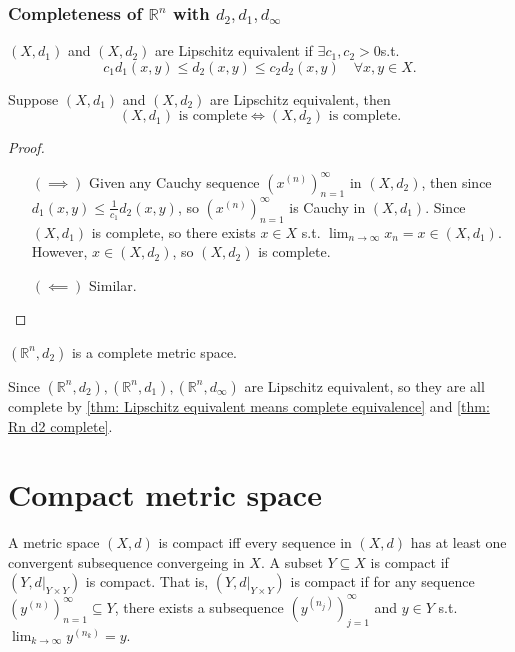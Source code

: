 \subsubsection{Completeness of \(\mathbb{R}^n\) with \(d_2, d_1, d_\infty \) }
\begin{prev}
    \((X, d_1)\) and \((X, d_2)\) are Lipschitz equivalent if \(\exists c_1, c_2 > 0\)s.t. 
    \[
        c_1 d_1(x, y) \le d_2(x, y) \le c_2 d_2(x, y) \quad \forall x, y \in X. 
    \]   
\end{prev}

\begin{theorem} \label{thm: Lipschitz equivalent means complete equivalence}
    Suppose \((X, d_1)\) and \((X, d_2)\) are Lipschitz equivalent, then 
    \[
        (X, d_1) \text{ is complete} \iff (X, d_2) \text{ is complete}.
    \]  
\end{theorem}
\begin{proof}
    \vphantom{text}
    \begin{itemize}
        \item [\((\implies )\)] Given any Cauchy sequence \(\left( x^{(n)} \right)_{n=1}^{\infty}  \) in \((X, d_2)\), then since \(d_1(x, y) \le \frac{1}{c_1} d_2(x, y)\), so \(\left( x^{(n)} \right)_{n=1}^{\infty}  \) is Cauchy in \((X, d_1)\). Since \((X, d_1)\) is complete, so there exists \(x \in X\) s.t. \(\lim_{n \to \infty} x_n = x \in (X, d_1)\). However, \(x \in (X, d_2)\), so \((X, d_2)\) is complete. 
        \item [\((\impliedby )\)] Similar.         
    \end{itemize}
\end{proof}

\begin{theorem} \label{thm: Rn d2 complete}
    \(\left( \mathbb{R} ^n, d_2 \right) \) is a complete metric space. 
\end{theorem}

\begin{corollary}
    Since \(\left( \mathbb{R}^n , d_2\right), \left( \mathbb{R} ^n, d_1 \right), \left( \mathbb{R} ^n, d_\infty  \right)   \) are Lipschitz equivalent, so they are all complete by \autoref{thm: Lipschitz equivalent means complete equivalence} and \autoref{thm: Rn d2 complete}.
\end{corollary}

\section{Compact metric space}
\begin{definition} \label{def: compect}
    A metric space \((X, d)\) is compact iff every sequence in \((X, d)\) has at least one convergent subsequence convergeing in \(X\). A subset \(Y \subseteq X\) is compact if \(\left( Y, d\vert_{Y \times Y} \right) \) is compact. That is, \(\left( Y, d\vert_{Y \times Y} \right) \) is compact if for any sequence \(\left( y^{(n)} \right)_{n=1}^{\infty } \subseteq  Y \), there exists a subsequence \(\left( y^{(n_j)} \right)_{j=1}^{\infty}  \) and \(y \in Y\)  s.t. \(\lim_{k \to \infty} y^{(n_k)} = y. \)     
\end{definition}


